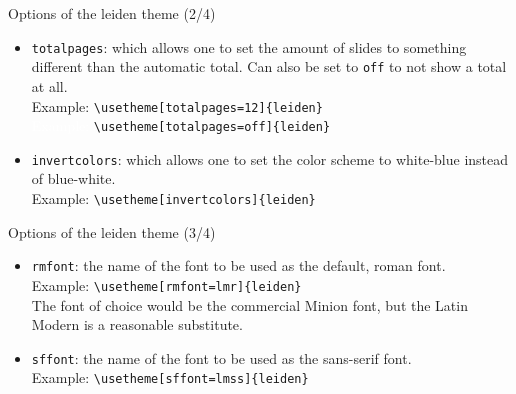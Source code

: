 \begin{frame}[fragile]{Options of the leiden theme (2/4)}
\begin{itemize}
\item	\alert{\texttt{totalpages}}: which allows one to set the
		amount of slides to something different than the
		automatic total. Can also be set to \texttt{off} to not show
		a total at all.\\
\vspace{0.1\baselineskip}
		Example: \verb|\usetheme[totalpages=12]{leiden}|\\
		\textcolor{white}{Example:} \verb|\usetheme[totalpages=off]{leiden}|
\vspace{0.5\baselineskip}
\item	\alert{\texttt{invertcolors}}: which allows one to set the color
		scheme to white-blue instead of blue-white.\\
\vspace{0.1\baselineskip}
		Example: \verb|\usetheme[invertcolors]{leiden}|
\end{itemize}
\end{frame}

\begin{frame}[fragile]{Options of the leiden theme (3/4)}
\begin{itemize}
\item	\alert{\texttt{rmfont}}: the name of the font to be
		used as the default, \textrm{roman font}.\\
\vspace{0.1\baselineskip}
		Example: \verb|\usetheme[rmfont=lmr]{leiden}|\\
\vspace{0.1\baselineskip}
		The font of choice would be the commercial Minion
		font, but the Latin Modern is a reasonable substitute.
\vspace{0.5\baselineskip}
\item	\alert{\texttt{sffont}}: the name of the font to be
		used as the \textsf{sans-serif font}.\\
\vspace{0.1\baselineskip}
		Example: \verb|\usetheme[sffont=lmss]{leiden}|
\end{itemize}
\end{frame}

